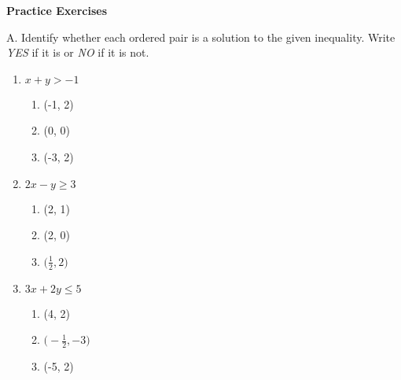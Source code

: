 \textbf{Practice Exercises}

\vspce

A. Identify whether each ordered pair is a solution to the given inequality. Write \emph{YES} if it is or \emph{NO} if it is not.
\begin{multicols}{3}
\begin{enumerate}[label = \arabic*. ]
\item \hspce $x+y>-1$
\begin{enumerate}[label = \alph*. ]
\item \hspce (-1, 2)
\item \hspce (0, 0)
\item \hspce (-3, 2) 
\end{enumerate}   

\vfill
\columnbreak

\item \hspce $2x-y \geq 3$
\begin{enumerate}[label = \alph*. ]
\item \hspce (2, 1)
\item \hspce (2, 0)
\item \hspce $\big(\displaystyle \frac{1}{2}, 2\big)$
\end{enumerate}  

\vfill
\columnbreak

\item \hspce $3x+2y \leq 5$
\begin{enumerate}[label = \alph*. ]
\item \hspce (4, 2)
\item $\big(-\displaystyle \frac{1}{2}, -3\big)$
\item \hspce (-5, 2)
\end{enumerate}  
\end{enumerate}  
\end{multicols} 

